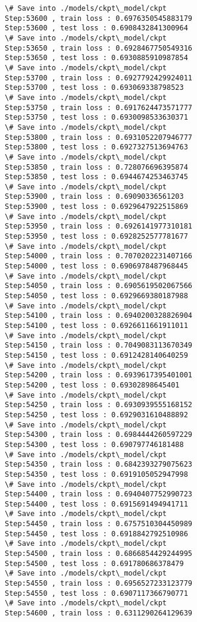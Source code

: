 \documentclass[11pt]{article}
\begin{document}
\begin{Verbatim}[commandchars=\\\{\}]
\# Save into ./models/ckpt\_model/ckpt
Step:53600 , train loss : 0.6976350545883179
Step:53600 , test loss : 0.6908432841300964
\# Save into ./models/ckpt\_model/ckpt
Step:53650 , train loss : 0.6928467750549316
Step:53650 , test loss : 0.6930885910987854
\# Save into ./models/ckpt\_model/ckpt
Step:53700 , train loss : 0.6927792429924011
Step:53700 , test loss : 0.693069338798523
\# Save into ./models/ckpt\_model/ckpt
Step:53750 , train loss : 0.6917624473571777
Step:53750 , test loss : 0.6930098533630371
\# Save into ./models/ckpt\_model/ckpt
Step:53800 , train loss : 0.6931052207946777
Step:53800 , test loss : 0.6927327513694763
\# Save into ./models/ckpt\_model/ckpt
Step:53850 , train loss : 0.728076696395874
Step:53850 , test loss : 0.6944674253463745
\# Save into ./models/ckpt\_model/ckpt
Step:53900 , train loss : 0.69090336561203
Step:53900 , test loss : 0.6929647922515869
\# Save into ./models/ckpt\_model/ckpt
Step:53950 , train loss : 0.6926141977310181
Step:53950 , test loss : 0.6928252577781677
\# Save into ./models/ckpt\_model/ckpt
Step:54000 , train loss : 0.7070202231407166
Step:54000 , test loss : 0.6906978487968445
\# Save into ./models/ckpt\_model/ckpt
Step:54050 , train loss : 0.6905619502067566
Step:54050 , test loss : 0.6929669380187988
\# Save into ./models/ckpt\_model/ckpt
Step:54100 , train loss : 0.6940200328826904
Step:54100 , test loss : 0.6926611661911011
\# Save into ./models/ckpt\_model/ckpt
Step:54150 , train loss : 0.7049083113670349
Step:54150 , test loss : 0.6912428140640259
\# Save into ./models/ckpt\_model/ckpt
Step:54200 , train loss : 0.6939617395401001
Step:54200 , test loss : 0.69302898645401
\# Save into ./models/ckpt\_model/ckpt
Step:54250 , train loss : 0.6930939555168152
Step:54250 , test loss : 0.6929031610488892
\# Save into ./models/ckpt\_model/ckpt
Step:54300 , train loss : 0.6984444260597229
Step:54300 , test loss : 0.690797746181488
\# Save into ./models/ckpt\_model/ckpt
Step:54350 , train loss : 0.6842393279075623
Step:54350 , test loss : 0.6919105052947998
\# Save into ./models/ckpt\_model/ckpt
Step:54400 , train loss : 0.6940407752990723
Step:54400 , test loss : 0.6915691494941711
\# Save into ./models/ckpt\_model/ckpt
Step:54450 , train loss : 0.6757510304450989
Step:54450 , test loss : 0.6918842792510986
\# Save into ./models/ckpt\_model/ckpt
Step:54500 , train loss : 0.6866854429244995
Step:54500 , test loss : 0.691780686378479
\# Save into ./models/ckpt\_model/ckpt
Step:54550 , train loss : 0.6956527233123779
Step:54550 , test loss : 0.6907117366790771
\# Save into ./models/ckpt\_model/ckpt
Step:54600 , train loss : 0.6311290264129639

\end{Verbatim}
\end{document}
